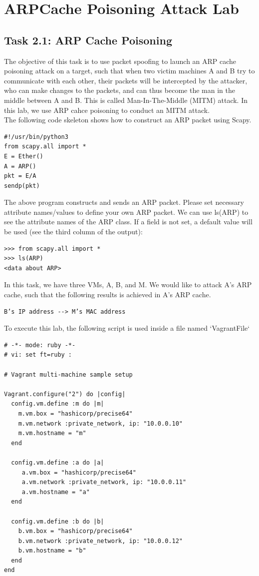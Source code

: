 \documentclass[12pt]{article}
\newcommand\tab[1][0.5cm]{\hspace*{#1}}
\begin{document}
\section{ARPCache Poisoning Attack Lab}
\subsection{Task 2.1: ARP Cache Poisoning}
The objective of this task is to use packet spoofing to launch an ARP cache poisoning attack on a target,
such that when two victim machines A and B try to communicate with each other, their packets will be
intercepted by the attacker, who can make changes to the packets, and can thus become the man in the
middle between A and B. This is called Man-In-The-Middle (MITM) attack. In this lab, we use ARP cahce
poisoning to conduct an MITM attack. \\
\tab The following code skeleton shows how to construct an ARP packet using Scapy.
\begin{verbatim}
#!/usr/bin/python3
from scapy.all import *
E = Ether()
A = ARP()
pkt = E/A
sendp(pkt)
\end{verbatim}

\tab The above program constructs and sends an ARP packet. Please set necessary attribute names/values to
define your own ARP packet. We can use ls(ARP) to see the attribute names of the ARP class. If a field
is not set, a default value will be used (see the third column of the output):

\begin{verbatim}
>>> from scapy.all import *
>>> ls(ARP)
<data about ARP>
\end{verbatim}
In this task, we have three VMs, A, B, and M. We would like to attack A’s ARP cache, such that the
following results is achieved in A’s ARP cache.

\begin{verbatim}
B’s IP address --> M’s MAC address
\end{verbatim}



To execute this lab, the following script is used inside a file named `VagrantFile`
\begin{verbatim}
# -*- mode: ruby -*-
# vi: set ft=ruby :

# Vagrant multi-machine sample setup

Vagrant.configure("2") do |config|
  config.vm.define :m do |m|
    m.vm.box = "hashicorp/precise64"
    m.vm.network :private_network, ip: "10.0.0.10"
    m.vm.hostname = "m"
  end

  config.vm.define :a do |a|
     a.vm.box = "hashicorp/precise64"
     a.vm.network :private_network, ip: "10.0.0.11"
     a.vm.hostname = "a"
  end

  config.vm.define :b do |b|
    b.vm.box = "hashicorp/precise64"
    b.vm.network :private_network, ip: "10.0.0.12"
    b.vm.hostname = "b"
  end
end
\end{verbatim}
\end{document}
